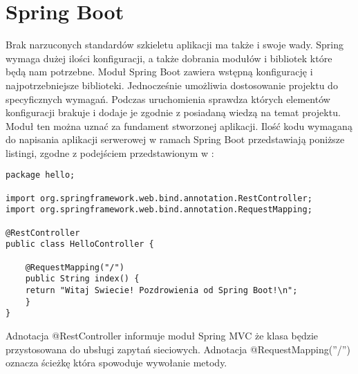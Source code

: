 \documentclass[a4paper,12pt,twoside,openany]{report}
\begin{document}
\section{Spring Boot}
Brak narzuconych standardów szkieletu aplikacji ma także i swoje wady. Spring wymaga dużej ilości konfiguracji, a także dobrania modułów i bibliotek które będą nam potrzebne. Moduł Spring Boot zawiera wstępną konfigurację i najpotrzebniejsze biblioteki. Jednocześnie umożliwia dostosowanie projektu do specyficznych wymagań. Podczas uruchomienia sprawdza których elementów konfiguracji brakuje i dodaje je zgodnie z posiadaną wiedzą na temat projektu. Moduł ten można uznać za fundament stworzonej aplikacji. Ilość kodu wymaganą do napisania aplikacji serwerowej w ramach Spring Boot przedstawiają poniższe listingi, zgodne z podejściem przedstawionym w \cite{Spring}:

\begin{lstlisting}[label={MVCController}]
package hello;

import org.springframework.web.bind.annotation.RestController;
import org.springframework.web.bind.annotation.RequestMapping;

@RestController
public class HelloController {

	@RequestMapping("/")
	public String index() {
	return "Witaj Swiecie! Pozdrowienia od Spring Boot!\n";
	}
}
\end{lstlisting}
Adnotacja @RestController informuje moduł Spring MVC że klasa będzie przystosowana do ubsługi zapytań sieciowych. Adnotacja @RequestMapping(''/'') oznacza ścieżkę która spowoduje wywołanie metody.
\end{document}
